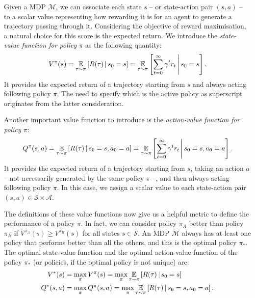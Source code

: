 Given a \acl{MDP} $\mathcal{M}$, we can associate each state $s$ -- or state-action pair $(s, a)$ -- to a scalar value representing how rewarding it is for an agent to generate a trajectory passing through it.
Considering the objective of reward maximisation, a natural choice for this score is the expected return.
We introduce the \emph{state-value function for policy $\pi$} as the following quantity:
%
\begin{equation}
    \label{equation:state_value_function}
    V^\pi(s) 
    = \operatorname*{\mathbb{E}}_{\tau \sim \pi} \left[ R(\tau) \operatorname{\mid} s_0 = s \right]
    = \operatorname*{\mathbb{E}}_{\tau \sim \pi} \left[ \sum_{t=0}^\infty \gamma^t r_t \,\middle\vert\, s_0 = s \right] .
\end{equation}
%
It provides the expected return of a trajectory starting from $s$ and always acting following policy $\pi$.
The need to specify which is the active policy as superscript originates from the latter consideration.

Another important value function to introduce is the \emph{action-value function for policy $\pi$}:
%
\begin{equation}
    \label{equation:action_value_function}
    Q^\pi(s, a) 
    = \operatorname*{\mathbb{E}}_{\tau \sim \pi} \left[ R(\tau) \operatorname{\mid} s_0 = s, a_0 = a \right]
    = \operatorname*{\mathbb{E}}_{\tau \sim \pi} \left[ \sum_{t=0}^\infty \gamma^t r_t \,\middle\vert\, s_0 = s, a_0 = a \right] .
\end{equation}
%
It provides the expected return of a trajectory starting from $s$, taking an action $a$ -- not necessarily generated by the same policy $\pi$ --, and then always acting following policy $\pi$.
In this case, we assign a scalar value to each state-action pair $(s, a) \in \mathcal{S} \times \mathcal{A}$.

The definitions of these value functions now give us a helpful metric to define the performance of a policy $\pi$.
In fact, we can consider policy $\pi_A$ better than policy $\pi_B$ if $V^{\pi_A}(s) \geq V^{\pi_B}(s)$ for all states $s \in \mathcal{S}$.
An \ac{MDP} $\mathcal{M}$ always has at least one policy that performs better than all the others, and this is the optimal policy $\pi_*$.
The optimal state-value function and the optimal action-value function of the policy $\pi_*$ (or policies, if the optimal policy is not unique) are:
%
\begin{align*}
    V^*(s) 
    &= \max_\pi V^\pi(s)
    = \max_\pi \operatorname*{\mathbb{E}}_{\tau \sim \pi} \left[ R(\tau) \operatorname{\mid} s_0 = s \right] \\
    Q^*(s, a)
    &= \max_\pi Q^\pi(s, a)
    = \max_\pi \operatorname*{\mathbb{E}}_{\tau \sim \pi} \left[ R(\tau) \operatorname{\mid} s_0 = s, a_0 = a \right] .
\end{align*}

